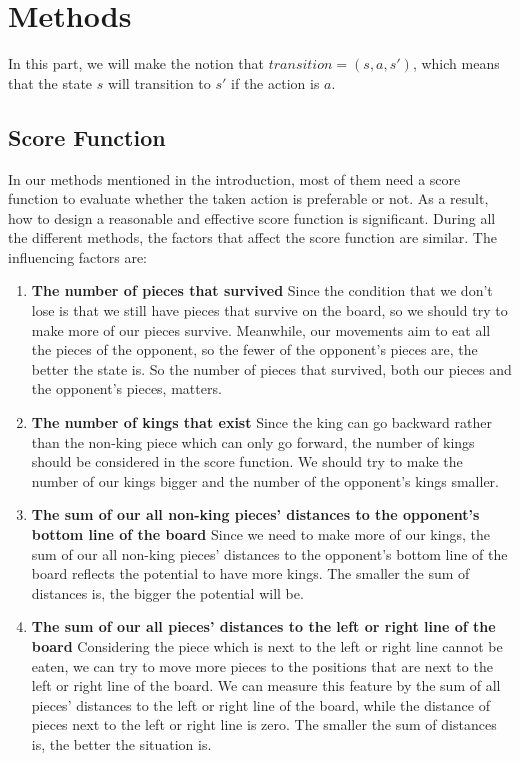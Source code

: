 \section{Methods}
In this part, we will make the notion that $transition = (s, a, s')$, which means that the state $s$ will transition to $s'$ if the action is $a$. 

\subsection{Score Function}
\label{score function}
In our methods mentioned in the introduction, most of them need a score function to evaluate whether the taken action is preferable or not. As a result, how to design a reasonable and effective score function is significant. During all the different methods, the factors that affect the score function are similar. The influencing factors are:
\begin{enumerate}
    \item \textbf{The number of pieces that survived} Since the condition that we don't lose is that we still have pieces that survive on the board, so we should try to make more of our pieces survive. Meanwhile, our movements aim to eat all the pieces of the opponent, so the fewer of the opponent's pieces are, the better the state is. So the number of pieces that survived, both our pieces and the opponent's pieces, matters.
    \item \textbf{The number of kings that exist} Since the king can go backward rather than the non-king piece which can only go forward, the number of kings should be considered in the score function. We should try to make the number of our kings bigger and the number of the opponent's kings smaller.
    \item \textbf{The sum of our all non-king pieces' distances to the opponent's bottom line of the board} Since we need to make more of our kings, the sum of our all non-king pieces' distances to the opponent's bottom line of the board reflects the potential to have more kings. The smaller the sum of distances is, the bigger the potential will be. 
    \item \textbf{The sum of our all pieces' distances to the left or right line of the board} Considering the piece which is next to the left or right line cannot be eaten, we can try to move more pieces to the positions that are next to the left or right line of the board. We can measure this feature by the sum of all pieces' distances to the left or right line of the board, while the distance of pieces next to the left or right line is zero. The smaller the sum of distances is, the better the situation is.
\end{enumerate}
